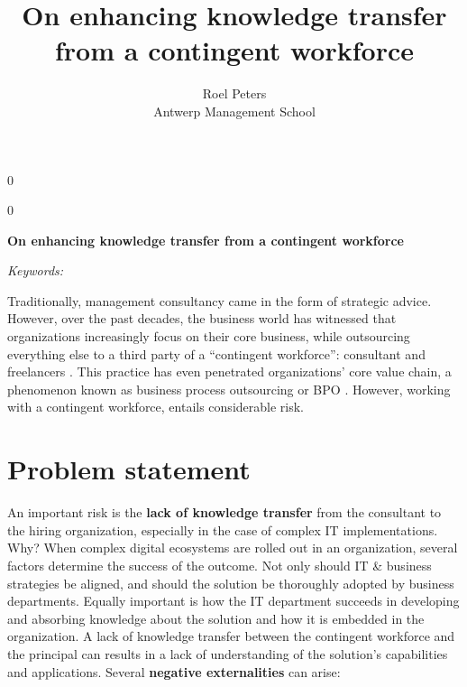 \documentclass[12pt]{article}
\newcommand{\blind}{0}
\begin{document}
\def\spacingset#1{\renewcommand{\baselinestretch}%
{#1}\small\normalsize} \spacingset{1}



\blind
{
  \title{\bf On enhancing knowledge transfer from a contingent
workforce}

  \author{
        Roel Peters \\
    Antwerp Management School\\
      }
  \maketitle
} \fi

\blind
{
  \bigskip
  \bigskip
  \bigskip
  \begin{center}
    {\LARGE\bf On enhancing knowledge transfer from a contingent
workforce}
  \end{center}
  \medskip
} \fi

\bigskip
\begin{abstract}

\end{abstract}

\noindent%
{\it Keywords:} 
\vfill

\newpage
\spacingset{1.45} %

Traditionally, management consultancy came in the form of strategic
advice. However, over the past decades, the business world has witnessed
that organizations increasingly focus on their core business, while
outsourcing everything else to a third party of a ``contingent
workforce'': consultant and freelancers \citep{msp2022}. This practice
has even penetrated organizations' core value chain, a phenomenon known
as business process outsourcing or BPO \citep{shi1}. However, working
with a contingent workforce, entails considerable risk.

\hypertarget{problem-statement}{%
\section{Problem statement}\label{problem-statement}}

An important risk is the \textbf{lack of knowledge transfer} from the
consultant to the hiring organization, especially in the case of complex
IT implementations. Why? When complex digital ecosystems are rolled out
in an organization, several factors determine the success of the
outcome. Not only should IT \& business strategies be aligned, and
should the solution be thoroughly adopted by business departments.
Equally important is how the IT department succeeds in developing and
absorbing knowledge about the solution and how it is embedded in the
organization. A lack of knowledge transfer between the contingent
workforce and the principal can results in a lack of understanding of
the solution's capabilities and applications. Several \textbf{negative
externalities} can arise:
\end{document}

